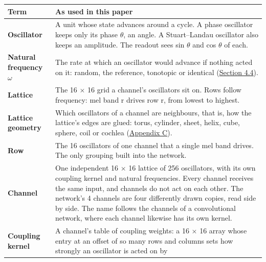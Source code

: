 \documentclass{article}
\begin{document}
{\def\LTcaptype{none} %
\begin{longtable}[]{@{}
  >{\raggedright\arraybackslash}p{}
  >{\raggedright\arraybackslash}p{}@{}}
\toprule\noalign{}
\begin{minipage}[b]{\linewidth}\raggedright
Term
\end{minipage} & \begin{minipage}[b]{\linewidth}\raggedright
As used in this paper
\end{minipage} \\
\midrule\noalign{}
\endhead
\bottomrule\noalign{}
\endlastfoot
\textbf{Oscillator} & A unit whose state advances around a cycle. A
phase oscillator keeps only its phase \ensuremath{\theta}, an angle. A
Stuart--Landau oscillator also keeps an amplitude. The readout sees sin
\ensuremath{\theta} and cos \ensuremath{\theta} of each. \\
\cmidrule{1-2}\textbf{Natural frequency \ensuremath{\omega}} & The rate
at which an oscillator would advance if nothing acted on it: random, the
reference, tonotopic or identical (\hyperref[sec-4-4]{Section 4.4}). \\
\cmidrule{1-2}\textbf{Lattice} & The 16 \ensuremath{\times} 16 grid a
channel's oscillators sit on. Rows follow frequency: mel band r drives
row r, from lowest to highest. \\
\cmidrule{1-2}\textbf{Lattice geometry} & Which oscillators of a channel
are neighbours, that is, how the lattice's edges are glued: torus,
cylinder, sheet, helix, cube, sphere, coil or cochlea
(\hyperref[sec-C]{Appendix C}). \\
\cmidrule{1-2}\textbf{Row} & The 16 oscillators of one channel that a
single mel band drives. The only grouping built into the network. \\
\cmidrule{1-2}\textbf{Channel} & One independent 16 \ensuremath{\times}
16 lattice of 256 oscillators, with its own coupling kernel and natural
frequencies. Every channel receives the same input, and channels do not
act on each other. The network's 4 channels are four differently drawn
copies, read side by side. The name follows the channels of a
convolutional network, where each channel likewise has its own
kernel. \\
\cmidrule{1-2}\textbf{Coupling kernel} & A channel's table of coupling
weights: a 16 \ensuremath{\times} 16 array whose entry at an offset of
so many rows and columns sets how strongly an oscillator is acted on by

\end{longtable}}
\end{document}
